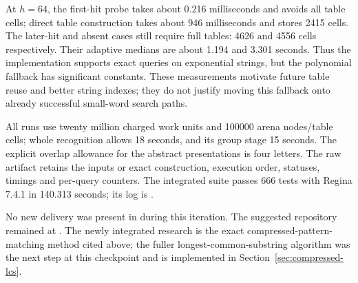 

At $h=64$, the first-hit probe takes about 0.216 milliseconds and avoids
all table cells; direct table construction takes about 946 milliseconds
and stores 2415 cells. The later-hit and absent cases still require full
tables: 4626 and 4556 cells respectively. Their adaptive medians are about
1.194 and 3.301 seconds. Thus the implementation supports exact queries on
exponential strings, but the polynomial fallback has significant constants.
These measurements motivate future table reuse and better string indexes;
they do not justify moving this fallback onto already successful small-word
search paths.

All runs use twenty million charged work units and 100000 arena nodes/table
cells; whole recognition allows 18 seconds, and its group stage 15 seconds.
The explicit overlap allowance for the abstract presentations is four
letters. The raw artifact 
retains the inputs or exact construction, execution order, statuses, timings
and per-query counters. The integrated suite passes 666 tests with Regina
7.4.1 in 140.313 seconds; its log is
.

No new delivery was present in  during this iteration.
The suggested  repository remained at
. The newly integrated research
is the exact compressed-pattern-matching method cited above; the fuller
longest-common-substring algorithm was the next step at this checkpoint and
is implemented in Section~\ref{sec:compressed-lcs}.
